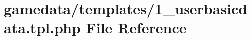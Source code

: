 \hypertarget{1__userbasicdata_8tpl_8php}{\section{gamedata/templates/1\+\_\+userbasicdata.tpl.\+php File Reference}
\label{1__userbasicdata_8tpl_8php}
}
